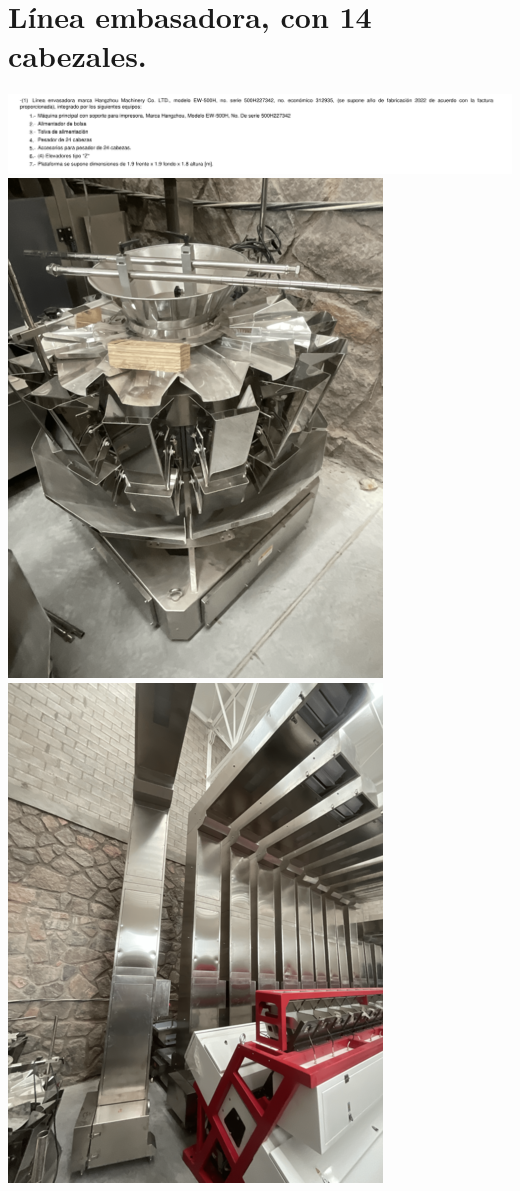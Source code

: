 \documentclass{article}
\begin{document}
\section{Línea embasadora, con 14 cabezales.} %
\includegraphics[width=  \linewidth]{images/decript/12.png}
\includegraphics[width=  .5\linewidth]{images/foto/12.png}
\includegraphics[width=  .5\linewidth]{images/foto/13.1.png}


\end{document}

